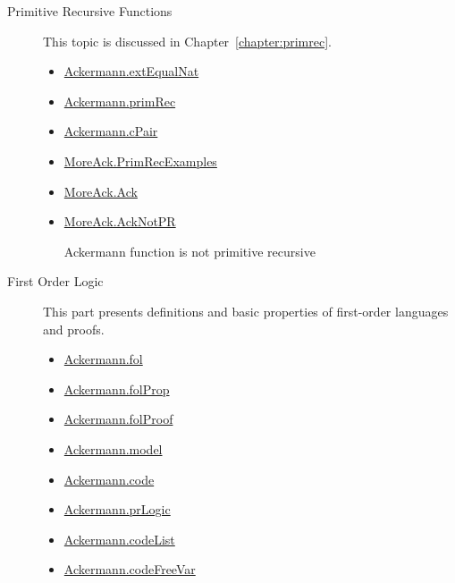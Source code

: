 \begin{description}

 \item[Primitive Recursive Functions]
  \mbox{}
  
 This topic is discussed in Chapter~\vref{chapter:primrec}.
  
  \begin{itemize}
\item
\href{../theories/html/hydras.Ackermann.extEqualNat.html}{Ackermann.extEqualNat}
  \item 
  \href{../theories/html/hydras.Ackermann.primRec.html}{Ackermann.primRec}
 \item 
  \href{../theories/html/hydras.Ackermann.cPair.html}{Ackermann.cPair}

\item 
  \href{../theories/html/hydras.MoreAck.PrimRecExamples.html}{MoreAck.PrimRecExamples}  
 \item 
  \href{../theories/html/hydras.MoreAck.Ack.html}{MoreAck.Ack}  
 
\item
  \href{../theories/html/hydras.MoreAck.AckNotPR.html}{MoreAck.AckNotPR}  

Ackermann function is not primitive recursive

  \end{itemize}


  
  
\item[First Order Logic]
  \mbox{}
  
This part presents \coq definitions and basic properties of first-order languages and proofs.

  \begin{itemize}
  \item \href{../theories/html/hydras.Ackermann.fol.html}{Ackermann.fol}
 \item \href{../theories/html/hydras.Ackermann.folProp.html}{Ackermann.folProp}
\item \href{../theories/html/hydras.Ackermann.folProof.html}{Ackermann.folProof}
\item \href{../theories/html/hydras.Ackermann.model.html}{Ackermann.model}
\item \href{../theories/html/hydras.Ackermann.code.html}{Ackermann.code}
 \item 
  \href{../theories/html/hydras.Ackermann.prLogic.html}{Ackermann.prLogic} 

\item \href{../theories/html/hydras.Ackermann.codeList.html}{Ackermann.codeList}
\item \href{../theories/html/hydras.Ackermann.codeFreeVar.html}{Ackermann.codeFreeVar}


\end{itemize}
\end{description}
